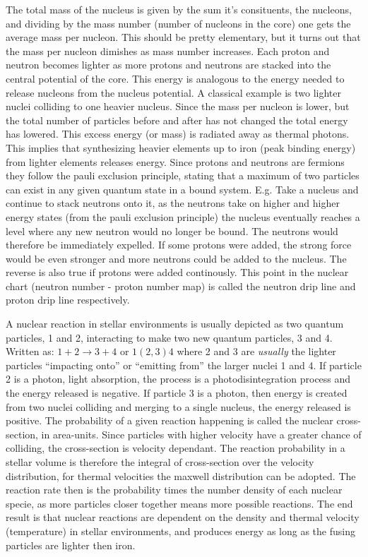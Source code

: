 The total mass of the nucleus is given by the sum it's consituents, the nucleons, and dividing by
the mass number (number of nucleons in the core) one gets the average mass per nucleon.
This should be pretty elementary, but it turns out that the mass per nucleon dimishes
as mass number increases. Each proton and neutron becomes lighter as more protons and neutrons are stacked
into the central potential of the core.
This energy is analogous to the energy needed to release nucleons from the nucleus potential.
A classical example is two lighter nuclei colliding to one heavier nucleus. Since
the mass per nucleon is lower, but the total number of particles before and after has not changed the total
energy has lowered. This excess energy (or mass) is radiated away as thermal photons.
This implies that synthesizing heavier elements up to iron (peak binding energy) from
lighter elements releases energy.
Since protons and neutrons are fermions they follow the pauli exclusion principle,
stating that a maximum of two particles can exist in any given quantum state in a bound system.
E.g. Take a nucleus and continue to stack neutrons onto it, as the neutrons take on
higher and higher energy states (from the pauli exclusion principle) the nucleus eventually reaches
a level where any new neutron would no longer be bound. The neutrons would therefore be immediately expelled.
If some protons were added, the strong force would be even stronger and more neutrons could be
added to the nucleus. The reverse is also true if protons were added continously.
This point in the nuclear chart (neutron number - proton number map) is called the neutron drip line
and proton drip line respectively.

A nuclear reaction in stellar environments is usually depicted as two quantum particles, 1 and 2,
interacting to make two new quantum particles, 3 and 4.
Written as: $1+2 \rightarrow 3+4$ or $1(2,3)4$ where 2 and 3 are \textit{usually} the lighter particles
``impacting onto'' or ``emitting from'' the larger nuclei 1 and 4.
If particle 2 is a photon, light absorption, the process is a photodisintegration process and the
energy released is negative.
If particle 3 is a photon, then energy is created from two nuclei colliding and merging to a single nucleus,
the energy released is positive.
The probability of a given reaction happening is called the nuclear cross-section, in area-units.
Since particles with higher velocity have a greater chance of colliding, the cross-section is velocity dependant.
The reaction probability in a stellar volume is therefore the integral of cross-section over the velocity distribution,
for thermal velocities the maxwell distribution can be adopted.
The reaction rate then is the probability times the number density of each nuclear specie, as more particles closer together means
more possible reactions.
The end result is that nuclear reactions are dependent on the density and
thermal velocity (temperature) in stellar environments, and produces energy as long as
the fusing particles are lighter then iron.

